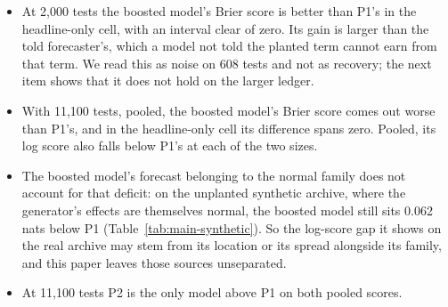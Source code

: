\begin{itemize}
\item At 2,000 tests the boosted model's Brier score is better than P1's in the headline-only cell, with an interval clear of zero. Its gain is larger than the told forecaster's, which a model not told the planted term cannot earn from that term. We read this as noise on 608 tests and not as recovery; the next item shows that it does not hold on the larger ledger.
\item With 11,100 tests, pooled, the boosted model's Brier score comes out worse than P1's, and in the headline-only cell its difference spans zero. Pooled, its log score also falls below P1's at each of the two sizes.
\item The boosted model's forecast belonging to the normal family does not account for that deficit: on the unplanted synthetic archive, where the generator's effects are themselves normal, the boosted model still sits 0.062 nats below P1 (Table~\ref{tab:main-synthetic}). So the log-score gap it shows on the real archive may stem from its location or its spread alongside its family, and this paper leaves those sources unseparated.
\item At 11,100 tests P2 is the only model above P1 on both pooled scores.
\end{itemize}

